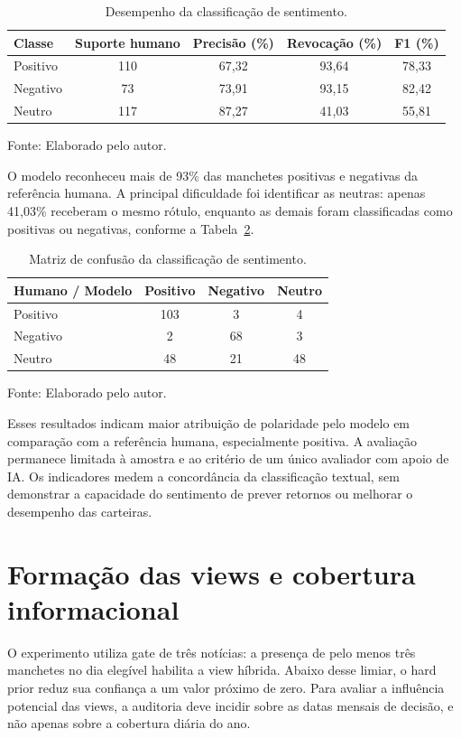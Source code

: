 \begin{table}[H]
\centering
\caption{Desempenho da classificação de sentimento.}
\label{tab:sentimento_metricas}
{\footnotesize
\begin{tabular}{@{}lcccc@{}}
\hline
Classe & Suporte humano & Precisão (\%) &
Revocação (\%) & F1 (\%) \\ \hline
Positivo & 110 & 67,32 & 93,64 & 78,33 \\
Negativo & 73 & 73,91 & 93,15 & 82,42 \\
Neutro & 117 & 87,27 & 41,03 & 55,81 \\
\hline
\end{tabular}}
\par
Fonte: Elaborado pelo autor.
\end{table}

O modelo reconheceu mais de 93\% das manchetes positivas
e negativas da referência humana. A principal dificuldade
foi identificar as neutras: apenas 41,03\% receberam o mesmo
rótulo, enquanto as demais foram classificadas como positivas
ou negativas, conforme a Tabela~\ref{tab:sentimento_confusao}.

\begin{table}[H]
\centering
\caption{Matriz de confusão da classificação de sentimento.}
\label{tab:sentimento_confusao}
{\footnotesize
\begin{tabular}{@{}lccc@{}}
\hline
Humano / Modelo & Positivo & Negativo & Neutro \\ \hline
Positivo & 103 & 3 & 4 \\
Negativo & 2 & 68 & 3 \\
Neutro & 48 & 21 & 48 \\
\hline
\end{tabular}}
\par
Fonte: Elaborado pelo autor.
\end{table}

Esses resultados indicam maior atribuição de polaridade pelo
modelo em comparação com a referência humana, especialmente
positiva. A avaliação permanece limitada à amostra e ao
critério de um único avaliador com apoio de IA. Os indicadores
medem a concordância da classificação textual, sem demonstrar
a capacidade do sentimento de prever retornos ou melhorar
o desempenho das carteiras.
\section{Formação das views e cobertura informacional}
O experimento utiliza gate de três notícias: a presença de pelo menos três manchetes no dia elegível habilita a view híbrida. Abaixo desse limiar, o hard prior reduz sua confiança a um valor próximo de zero. Para avaliar a influência potencial das views, a auditoria deve incidir sobre as datas mensais de decisão, e não apenas sobre a cobertura diária do ano.

